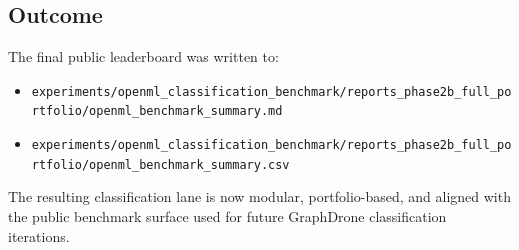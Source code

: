 \subsection{Outcome}

The final public leaderboard was written to:
\begin{itemize}
\item \texttt{experiments/openml\_classification\_benchmark/reports\_phase2b\_full\_portfolio/openml\_benchmark\_summary.md}
\item \texttt{experiments/openml\_classification\_benchmark/reports\_phase2b\_full\_portfolio/openml\_benchmark\_summary.csv}
\end{itemize}

The resulting classification lane is now modular, portfolio-based, and aligned with the public benchmark surface used for future GraphDrone classification iterations.
